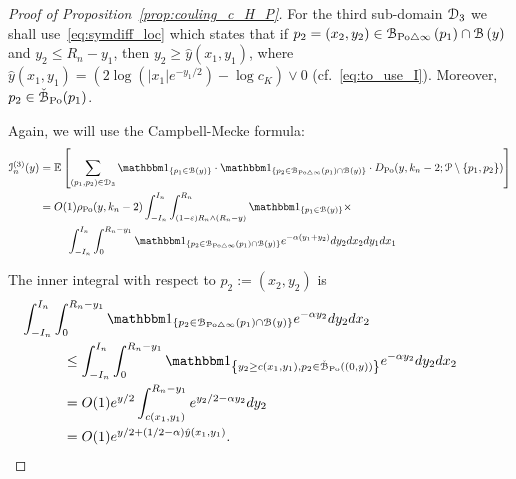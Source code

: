 \begin{proof}[Proof of Proposition~\ref{prop:couling_c_H_P}]
For the third sub-domain $\mathcal{D}_{3}$ we shall use~\eqref{eq:symdiff_loc} which states that if 
$p_2=(x_2,y_2) \in {\mathcal B}_{{\mathrm{Po}} \bigtriangleup \infty}\left(p_1\right)\cap {\mathcal B}\left(y\right)$ and $y_2\leq R_n - y_1$, then 
$y_2 \geq \hat{y}(x_1,y_1)$, where $\hat{y}(x_1,y_1) = \left(2 \log(|x_1|e^{-y_1/2}) - \log c_K \right) \vee 0$ (cf.~\eqref{eq:to_use_I}). Moreover, $p_2 \in \check{{\mathcal B}}_{{\mathrm{Po}}}(p_1)$.


Again, we will use the Campbell-Mecke formula: 
\begin{align*}
	\mathcal{I}_n^{(3)}(y) &= \Exp { \sum_{(p_1,p_2)  \in \dom{3}} 
		\ind{p_1 \in \BallHyp{y}} \cdot \ind{p_2 \in \BallSym{p_1} \cap \BallHyp{y}}
		\cdot D_{\Po} (y,k_n-2;\Pcal \setminus \{ p_1, p_2\})} \\
	&= O(1) \rho_{\Po}(y,k_n-2) \int_{-I_n}^{I_n} \int_{(1-\eps) R_n \wedge (R_n-y)}^{R_n} \ind{p_1 \in \BallHyp{y}}
		\times\\
	&\hspace{25pt} \int_{-I_n}^{I_n} \int_{0}^{R_n-y_1} 
		\ind{p_2 \in \BallSym{p_1} \cap \BallHyp{y}} 
		e^{-\alpha(y_1 + y_2)} dy_2 dx_2 dy_1 dx_1 \\
\end{align*}

The inner integral with respect to $p_2 := (x_2,y_2)$ is 
\begin{align*}
	&\hspace{-30pt} \int_{-I_n}^{I_n} \int_{0}^{R_n - y_1}  \ind{p_2 \in \BallSym{p_1}\cap \BallHyp{y}}  
		e^{-\alpha y_2} dy_2 dx_2\\
	&\leq \int_{-I_n}^{I_n} \int_{0}^{R_n-y_1}  \ind{y_2 \geq c(x_1,y_1), p_2 \in \FatBallHyp{(0,y)}}  
		e^{-\alpha y_2} dy_2 dx_2 \\
	&= O(1) e^{y/2} \int_{c(x_1,y_1)}^{R_n - y_1} e^{y_2/2 - \alpha y_2} dy_2 \\
	&= O(1) e^{y/2 + (1/2 -\alpha) \hat{y}(x_1,y_1)}.
\end{align*}


\end{proof}
